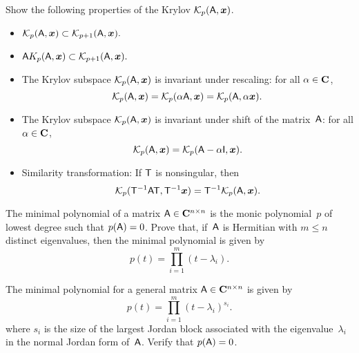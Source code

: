 \begin{exercise}
    Show the following properties of the Krylov $\mathcal K_p(\mathsf A, \mathbf{\boldsymbol{x}})$.
    \begin{itemize}
        \item
            \(
                \mathcal K_p(\mathsf A, \mathbf{\boldsymbol{x}}) \subset \mathcal K_{p+1}(\mathsf A, \mathbf{\boldsymbol{x}}).
            \)

        \item
            \(
                \mathsf A K_p(\mathsf A, \mathbf{\boldsymbol{x}}) \subset \mathcal K_{p+1}(\mathsf A, \mathbf{\boldsymbol{x}}).
            \)

        \item
            The Krylov subspace $\mathcal K_p(\mathsf A, \mathbf{\boldsymbol{x}})$ is invariant under rescaling:
            for all $\alpha \in \mathbf C$,
            \[
                \mathcal K_p(\mathsf A, \mathbf{\boldsymbol{x}}) = \mathcal K_p(\alpha \mathsf A, \mathbf{\boldsymbol{x}}) = \mathcal K_p(\mathsf A, \alpha \mathbf{\boldsymbol{x}}).
            \]

        \item
            The Krylov subspace $\mathcal K_p(\mathsf A, \mathbf{\boldsymbol{x}})$ is invariant under shift of the matrix~$\mathsf A$:
            for all $\alpha \in \mathbf C$,
            \[
                \mathcal K_p(\mathsf A, \mathbf{\boldsymbol{x}}) = \mathcal K_p(\mathsf A - \alpha \mathsf I, \mathbf{\boldsymbol{x}}).
            \]

        \item
            Similarity transformation: If $\mathsf T$ is nonsingular,
            then
            \[
                \mathcal K_p(\mathsf T^{-1} \mathsf A \mathsf T, \mathsf T^{-1} \mathbf{\boldsymbol{x}}) =
                \mathsf T^{-1} \mathcal K_p(\mathsf A, \mathbf{\boldsymbol{x}}).
            \]
    \end{itemize}
\end{exercise}

\begin{exercise}
    The minimal polynomial of a matrix $\mathsf A \in \mathbf C^{n \times n}$ is the monic polynomial~$p$ of lowest degree such that $p(\mathsf A) = 0$.
    Prove that, if~$\mathsf A$ is Hermitian with $m \leq n$ distinct eigenvalues,
    then the minimal polynomial is given by
    \[
        p(t) = \prod_{i=1}^m (t - \lambda_i).
    \]
\end{exercise}

\begin{exercise}
    The minimal polynomial for a general matrix $\mathsf A \in \mathbf C^{n \times n}$ is given by
    \[
        p(t) = \prod_{i=1}^m (t - \lambda_i)^{s_i}.
    \]
    where $s_i$ is the size of the largest Jordan block associated with the eigenvalue~$\lambda_i$ in the normal Jordan form of~$\mathsf A$.
    Verify that $p(\mathsf A) = 0$.
\end{exercise}

